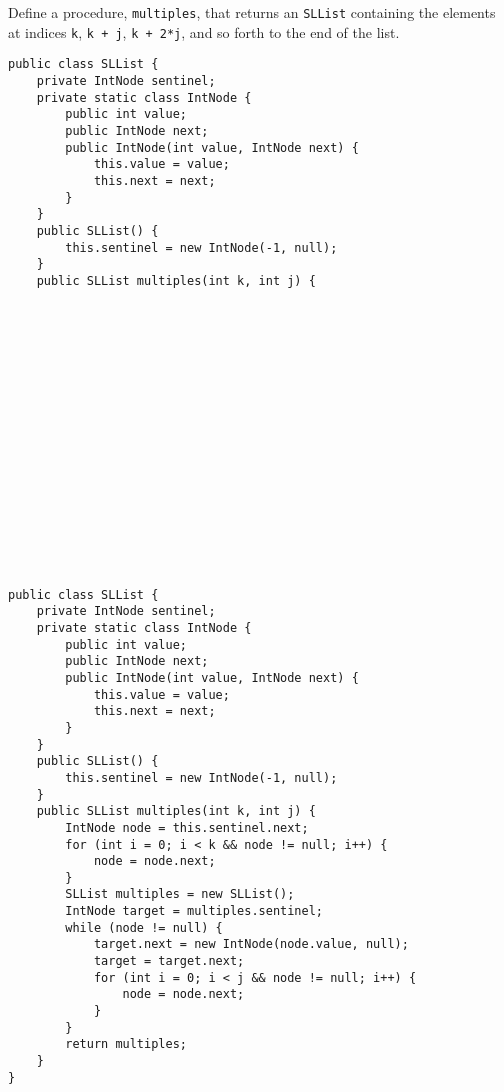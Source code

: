 \question Define a procedure, \texttt{multiples}, that returns an \texttt{SLList} containing the elements at indices \texttt{k}, \texttt{k + j}, \texttt{k + 2*j}, and so forth to the end of the list.

\ifprintanswers\else
\begin{lstlisting}
public class SLList {
    private IntNode sentinel;
    private static class IntNode {
        public int value;
        public IntNode next;
        public IntNode(int value, IntNode next) {
            this.value = value;
            this.next = next;
        }
    }
    public SLList() {
        this.sentinel = new IntNode(-1, null);
    }
    public SLList multiples(int k, int j) {


















\end{lstlisting}
\fi

\begin{solution}
\begin{lstlisting}
public class SLList {
    private IntNode sentinel;
    private static class IntNode {
        public int value;
        public IntNode next;
        public IntNode(int value, IntNode next) {
            this.value = value;
            this.next = next;
        }
    }
    public SLList() {
        this.sentinel = new IntNode(-1, null);
    }
    public SLList multiples(int k, int j) {
        IntNode node = this.sentinel.next;
        for (int i = 0; i < k && node != null; i++) {
            node = node.next;
        }
        SLList multiples = new SLList();
        IntNode target = multiples.sentinel;
        while (node != null) {
            target.next = new IntNode(node.value, null);
            target = target.next;
            for (int i = 0; i < j && node != null; i++) {
                node = node.next;
            }
        }
        return multiples;
    }
}
\end{lstlisting}
\end{solution}